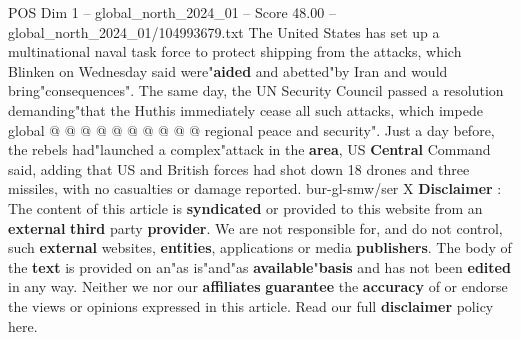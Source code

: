 \begin{textsample}{POS Dim 1 – global\_north\_2024\_01 – Score 48.00 – global\_north\_2024\_01/104993679.txt}
The United States has set up a multinational naval task force to protect shipping from the attacks, which Blinken on Wednesday said were"\textbf{aided} and abetted"by Iran and would bring"consequences".
The same day, the UN Security Council passed a resolution demanding"that the Huthis immediately cease all such attacks, which impede global @ @ @ @ @ @ @ @ @ @ regional peace and security".
Just a day before, the rebels had"launched a complex"attack in the \textbf{area}, US \textbf{Central} Command said, adding that US and British forces had shot down 18 drones and three missiles, with no casualties or damage reported. bur-gl-smw/ser X \textbf{Disclaimer} : The content of this article is \textbf{syndicated} or provided to this website from an \textbf{external} \textbf{third} party \textbf{provider}.
We are not responsible for, and do not control, such \textbf{external} websites, \textbf{entities}, applications or media \textbf{publishers}.
The body of the \textbf{text} is provided on an"as is"and"as \textbf{available}"\textbf{basis} and has not been \textbf{edited} in any way.
Neither we nor our \textbf{affiliates} \textbf{guarantee} the \textbf{accuracy} of or endorse the views or opinions expressed in this article.
Read our full \textbf{disclaimer} policy here.

\end{textsample}
